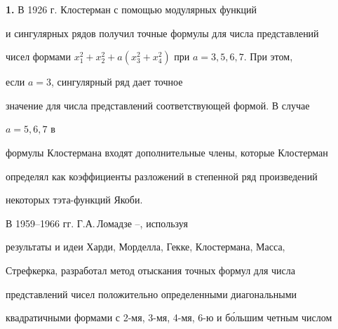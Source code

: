 



\date{}







\pagestyle{plain} %













\maketitle


\label{begin}





{\bf 1.} В 1926 г. Клостерман \cite{K1} с помощью модулярных функций


и сингулярных рядов получил точные формулы для числа представлений


чисел формами $x^2_1+x^2_2+a(x^2_3+x^2_4)$ при $a=3,5,6,7$. При этом,


если $a=3$, сингулярный ряд дает точное


значение для числа представлений соответствующей формой. В случае


$a=5,6,7$ в


формулы Клостермана входят дополнительные члены, которые Клостерман


определял как коэффициенты разложений в степенной ряд произведений


некоторых тэта-функций Якоби.





В 1959--1966 гг. Г.А.\,Ломадзе \cite{L2}--\cite{L9}, используя


результаты и идеи Харди, Морделла, Гекке, Клостермана, Масса,


Стрефкерка, разработал метод отыскания точных формул для числа


представлений чисел положительно определенными диагональными


квадратичными формами с 2-мя, 3-мя, 4-мя, 6-ю и б\'ольшим четным числом


